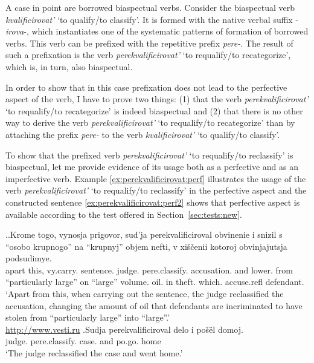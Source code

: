 A case in point are borrowed biaspectual verbs. Consider the biaspectual verb \textit{kvalificirovat'} `to qualify/to classify'. It is formed with the native verbal suffix -\textit{irova}-, which instantiates one of the systematic patterns of formation of borrowed verbs. This verb can be prefixed with the repetitive prefix \textit{pere-}. The result of such a prefixation is the verb \textit{perekvalificirovat'} `to requalify/to recategorize', which is, in turn, also biaspectual.

In order to show that in this case prefixation does not lead to the perfective aspect of the verb, I have to prove two things: (1) that the verb \textit{perekvalificirovat'} `to requalify/to recategorize' is indeed biaspectual and (2) that there is no other way to derive the verb \textit{perekvalificirovat'} `to requalify/to recategorize' than by attaching the prefix \textit{pere-} to the verb \textit{kvalificirovat'} `to qualify/to classify'.

To show that the prefixed verb \textit{perekvalificirovat'} `to requalify/to reclassify' is  biaspectual, let me provide evidence of its usage both as a perfective and as an imperfective verb. Example \ref{ex:perekvalificirovat:perf} illustrates the usage of the verb \textit{perekvalificirovat'} `to requalify/to reclassify' in the perfective aspect and the constructed sentence \ref{ex:perekvalificirovat:perf2} shows that perfective aspect is available according to the test offered in Section~\ref{sec:tests:new}.

\ex.\ag.\label{ex:perekvalificirovat:perf}Krome togo, vynosja prigovor, sud'ja perekvalificiroval obvinenie i snizil s ``osobo krupnogo'' na ``krupnyj'' objem nefti, v xi\v{s}\v{c}enii kotoroj obvinjajutsja podsudimye.\\
apart this, vy.carry. sentence. judge. pere.classify. accusation. and lower. from ``particularly large'' on ``large'' volume. oil. in theft. which. accuse.refl defendant.\\
\trans `Apart from this, when carrying out the sentence, the judge reclassified the accusation, changing the amount of oil that defendants are incriminated to have stolen from ``particularly large'' into ``large''.'\\
\hbox{}\hfill\hbox{\url{http://www.vesti.ru}}
\bg.\label{ex:perekvalificirovat:perf2}Sudja perekvalificiroval delo i po\v{s}\"{e}l domoj.\\
judge. pere.classify. case. and po.go. home\\
\trans `The judge reclassified the case and went home.'

